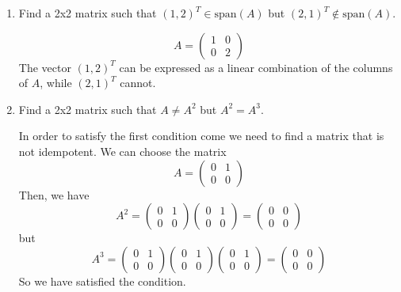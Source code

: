\documentclass[12pt]{article}
\begin{document}
\begin{enumerate}
\begin{enumerate}
        \item Find a 2x2 matrix such that \((1, 2)^T \in \text{span}(A)\) but \((2, 1)^T \notin \text{span}(A)\).
        
        \[
        A = \begin{pmatrix}
            1 & 0 \\
            0 & 2
        \end{pmatrix}
        \]
        The vector \((1, 2)^T\) can be expressed as a linear combination of the columns of \(A\), while \((2, 1)^T\) cannot.
        
        \item Find a 2x2 matrix such that \(A \neq A^2\) but \(A^2 = A^3\).
        
        In order to satisfy the first condition come we need to find a matrix that is not idempotent. We can choose the matrix
        \begin{equation}
            A = \begin{pmatrix}
                0 & 1 \\
                0 & 0
            \end{pmatrix}
        \end{equation}
        Then, we have
        \begin{equation}
            A^2 = \begin{pmatrix}
                0 & 1 \\
                0 & 0
            \end{pmatrix} \begin{pmatrix}
                0 & 1 \\
                0 & 0
            \end{pmatrix} = \begin{pmatrix}
                0 & 0 \\
                0 & 0
            \end{pmatrix}
        \end{equation}
        but
        \begin{equation}
            A^3 = \begin{pmatrix}
                0 & 1 \\
                0 & 0
            \end{pmatrix} \begin{pmatrix}
                0 & 1 \\
                0 & 0
            \end{pmatrix} \begin{pmatrix}
                0 & 1 \\
                0 & 0
            \end{pmatrix} = \begin{pmatrix}
                0 & 0 \\
                0 & 0
            \end{pmatrix}
        \end{equation}
        So we have satisfied the condition.
    \end{enumerate}


\end{enumerate}
\end{document}
